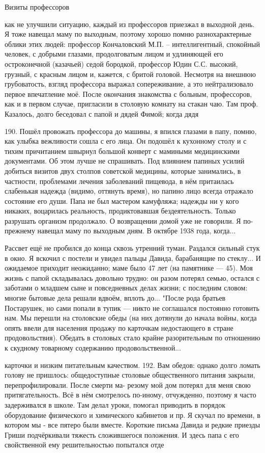 Визиты профессоров

как не улучшили ситуацию, каждый из профессоров приезжал в выходной день. Я тоже навещал маму по выходным, поэтому хорошо помню разнохарактерные облики этих людей: профессор Кончаловский М.П. – интеллигентный, спокойный человек, с добрыми глазами, продолговатым лицом и удлиняющей его остроконечной (казачьей) седой бородкой, профессор Юдин С.С. высокий, грузный, с красным лицом и, кажется, с бритой головой. Несмотря на внешнюю грубоватость, взгляд профессора выражал сопереживание, а это нейтрализовало первое впечатление моё. После окончания знакомства с больным, профессоров, как и в первом случае, пригласили в столовую комнату на стакан чаю. Там проф. Казалось, долго беседовал с папой и дядей Фимой; когда дядя

190. Пошёл провожать профессора до машины, я впился глазами в папу, помню, как улыбка вежливости сошла с его лица. Он подошёл к кухонному столу и с тихим причитанием швырнул большой конверт с мамиными медицинскими документами. Об этом лучше не спрашивать. Под влиянием папиных усилий добиться визитов двух столпов советской медицины, которые занимались, в частности, проблемами лечения заболеваний пищевода, в нём притаилась слабенькая надежда (видимо, оттянуть время), но папино лицо всегда отражало состояние его души. Папа не был мастером камуфляжа; надежды ни у кого никаких, воцарилась реальность, продиктовавшая бездеятельность. Только разрушать организм продолжало. О возвращении домой уже не говорили. Я по-прежнему навещал маму по выходным дням. В октябре 1938 года, когда...

Рассвет ещё не пробился до конца сквозь утренний туман. Раздался сильный стук в окно. Я вскочил с постели и увидел пальцы Давида, барабанящие по стеклу... И ожидаемое приходит неожиданно; маме было 47 лет (на памятнике — 45). Моя жизнь с папой складывалась довольно трудно: он разом потерял семью, остался с заботами о младшем сыне и повседневных делах жизни; с последним словом: многие бытовые дела решали вдвоём, вплоть до... "После рода братьев Постарушек, но сами попали в тупик — никто не соглашался постоянно готовить нам. Мы перешли на столовские обеды (на них дотянули до начала войны, когда опять ввели для населения продажу по карточкам недостающего в стране продовольствия). Обедать в столовых стало крайне разорительным по отношению к скудному товарному содержанию продовольственной...

карточки и низким питательным качеством. 192. Вам обедов: однако долго ломать голову не пришлось: общедоступные столовые общественного питания закрыли, перепрофилировали. После смерти ма- резому мой дом потерял для меня свою притягательность. Всё в нём смотрелось по-иному, отчужденно, поэтому я часто задерживался в школе. Там делал уроки, помогал приводить в порядок оборудование физического и химического кабинетов и пр. Я скучал по времени, в котором мы - все пятеро были вместе. Короткие письма Давида и редкие приезды Гриши подчёркивали тяжесть сложившегося положения. И здесь папа с его свойственной ему решительностью попытался отде

